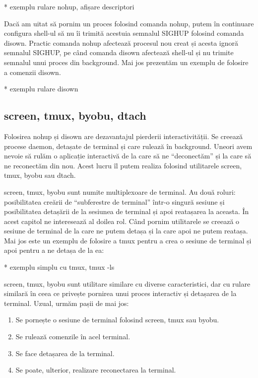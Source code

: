 * exemplu rulare nohup, afișare descriptori

Dacă am uitat să pornim un proces folosind comanda nohup, putem în continuare
configura shell-ul să nu îi trimită acestuia semnalul SIGHUP folosind comanda
disown. Practic comanda nohup afectează procesul nou creat și acesta ignoră
semnalul SIGHUP, pe când comanda disown afectează shell-ul și nu trimite
semnalul unui proces din background. Mai jos prezentăm un exemplu de folosire a
comenzii disown.

* exemplu rulare disown

\subsection{screen, tmux, byobu, dtach}
\label{sec:procese-interactivitate-screen}

Folosirea nohup și disown are dezavantajul pierderii interactivității. Se
creează procese daemon, detașate de terminal și care rulează în background.
Uneori avem nevoie să rulăm o aplicație interactivă de la care să ne
“deconectăm” și la care să ne reconectăm din nou. Acest lucru îl putem realiza
folosind utilitarele screen, tmux, byobu sau dtach.

screen, tmux, byobu sunt numite multiplexoare de terminal. Au două roluri:
posibilitatea creării de “subferestre de terminal” într-o singură sesiune și
posibilitatea detașării de la sesiunea de terminal și apoi reatașarea la
aceasta. În acest capitol ne interesează al doilea rol. Când pornim utilitarele
se creează o sesiune de terminal de la care ne putem detașa și la care apoi ne
putem reatașa. Mai jos este un exemplu de folosire a tmux pentru a crea o
sesiune de terminal și apoi pentru a ne detașa de la ea:

* exemplu simplu cu tmux, tmux -ls

screen, tmux, byobu sunt utilitare similare cu diverse caracteristici, dar cu
rulare similară în ceea ce privește pornirea unui proces interactiv și detașarea
de la terminal. Uzual, urmăm pașii de mai jos:

\begin{enumerate}
	\item Se pornește o sesiune de terminal folosind screen, tmux sau byobu.
	\item Se rulează comenzile în acel terminal.
	\item Se face detașarea de la terminal.
	\item Se poate, ulterior, realizare reconectarea la terminal.
\end{enumerate}

